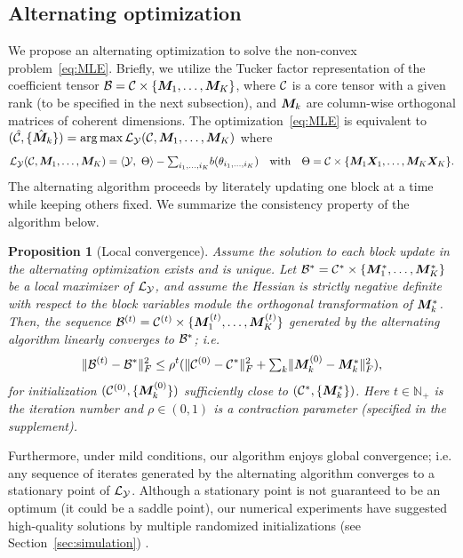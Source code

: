 \documentclass{article}
\theoremstyle{plain}
\newtheorem{prop}{Proposition}
\theoremstyle{definition}
\begin{document}
\subsection{Alternating optimization}
We propose an alternating optimization to solve the non-convex problem~\eqref{eq:MLE}. Briefly, we utilize the Tucker factor representation of the coefficient tensor $\mathcal{B}=\mathcal{C}\times \{\bm M_1,\ldots,\bm M_K\}$, where $\mathcal{C}$ is a core tensor with a given rank (to be specified in the next subsection), and $\bm M_k$ are column-wise orthogonal matrices of coherent dimensions. The optimization~\eqref{eq:MLE} is equivalent to $ (\hat {\mathcal{C}}, \{\hat {\bm M}_k\})=\arg\max \mathcal{L}_{\mathcal{Y}}(\mathcal{C}, \bm M_1,\ldots,\bm M_K) $ where 
\begin{equation*}
    \mathcal{L}_{\mathcal{Y}}(\mathcal{C}, \bm M_1,\ldots,\bm M_K) = \langle \mathcal{Y},\ \Theta\rangle -\textstyle{\sum_{i_1,\ldots,i_K}}b(\theta_{i_1,\ldots,i_K}) \quad \text{with}\quad \Theta =\mathcal{C}\times\{\bm M_1\bm X_1,\ldots,\bm M_K\bm X_K\}.
\end{equation*}
The alternating algorithm proceeds by literately updating one block at a time while keeping others fixed. We summarize the consistency property of the algorithm below. 

\begin{prop} [Local convergence] Assume the solution to each block update in the alternating optimization exists and is unique. Let $\mathcal{B}^*=\mathcal{C}^*\times\{\bm M^*_1,\ldots,\bm M^*_K\}$ be a local maximizer of $\mathcal{L}_{\mathcal{Y}}$, and assume the Hessian is strictly negative definite with respect to the block variables module the orthogonal transformation of $\bm M^*_k$. Then, the sequence $\mathcal{B}^{(t)}=\mathcal{C}^{(t)}\times\{\bm M^{(t)}_1,\ldots,\bm M^{(t)}_K\}$ generated by the alternating algorithm linearly converges to $\mathcal{B}^*$; i.e.
\[
\lVert\mathcal{B}^{(t)}-\mathcal{B}^*\rVert_F^2 \leq \rho^t ( \lVert\mathcal{C}^{(0)}-\mathcal{C}^*\rVert_F^2+\textstyle{\sum_k}\lVert\bm M^{(0)}_k-\bm M^*_k\rVert_F^2),
\]
for initialization $(\mathcal{C}^{(0)}, \{\bm M^{(0)}_k\})$ sufficiently close to $(\mathcal{C}^{*}, \{\bm M^{*}_k\})$. Here $t\in\mathbb{N}_{+}$ is the iteration number and $\rho\in(0,1)$ is a contraction parameter (specified in the supplement).
\end{prop}
Furthermore, under mild conditions, our algorithm enjoys global convergence; i.e. any sequence of iterates generated by the alternating algorithm converges to a stationary point of $\mathcal{L}_{\mathcal{Y}}$. Although a stationary point is not guaranteed to be an optimum (it could be a saddle point), our numerical experiments have suggested high-quality solutions by multiple randomized initializations (see Section~\ref{sec:simulation}) . 
\vspace{-.2cm}
\end{document}
